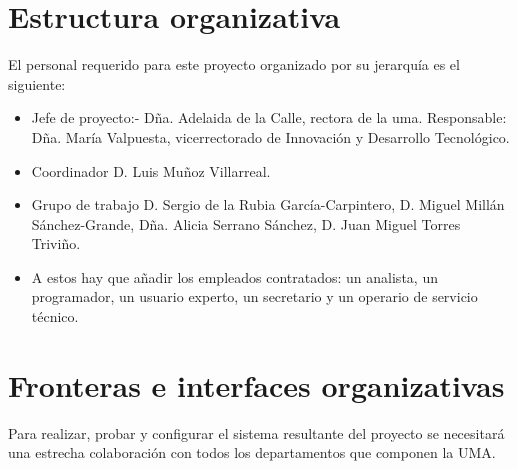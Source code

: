 \documentclass[11pt,a4paper,spanish,twoside]{report}
\begin{document}
\section{Estructura organizativa}
El personal requerido para este proyecto organizado por su jerarquía es el 
siguiente:
\begin{itemize}
\item Jefe de proyecto:- Dña. Adelaida de la Calle, rectora de la uma.
  Responsable: Dña. María Valpuesta, vicerrectorado de Innovación y Desarrollo 
  Tecnológico.
\item Coordinador D. Luis Muñoz Villarreal.
\item Grupo de trabajo D. Sergio de la Rubia García-Carpintero, D. Miguel 
  Millán Sánchez-Grande, Dña. Alicia Serrano Sánchez, D. Juan Miguel Torres 
  Triviño. 
\item A estos hay que añadir los empleados contratados: un analista, un 
  programador, un usuario experto, un secretario y un operario de servicio 
  técnico.
\end{itemize}

\section{Fronteras e interfaces organizativas}
Para realizar, probar y configurar el sistema resultante del proyecto se 
necesitará una estrecha colaboración con todos los departamentos que componen 
la UMA. 
\end{document}
